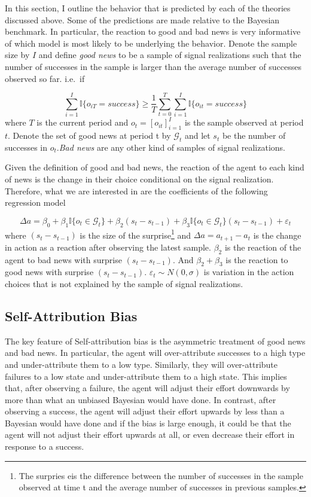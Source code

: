 \documentclass[
  12pt,
]{article}
\begin{document}
In this section, I outline the behavior that is predicted by each of the
theories discussed above. Some of the predictions are made relative to
the Bayesian benchmark. In particular, the reaction to good and bad news
is very informative of which model is most likely to be underlying the
behavior. Denote the sample size by \(I\) and define \emph{good news} to
be a sample of signal realizations such that the number of successes in
the sample is larger than the average number of successes observed so
far. i.e.~if

\[ \sum_{i=1}^I \mathbb{I}\{o_{iT}=success\} \geq \frac{1}{T} \sum_{t=0}^T\sum_{i=1}^I \mathbb{I}\{o_{it}=success\}\]
where \(T\) is the current period and \(o_{t}=[o_{it}]_{i=1}^I\) is the
sample observed at period \(t\). Denote the set of good news at period t
by \(\mathcal{G}_t\) and let \(s_t\) be the number of successes in
\(o_t\).\emph{Bad news} are any other kind of samples of signal
realizations.

Given the definition of good and bad news, the reaction of the agent to
each kind of news is the change in their choice conditional on the
signal realization. Therefore, what we are interested in are the
coefficients of the following regression model

\[ \Delta a = \beta_0 + \beta_1\mathbb{I}\{o_t\in \mathcal{G}_t\} + \beta_2(s_{t} - s_{t-1}) + \beta_3\mathbb{I}\{o_t\in \mathcal{G}_t\}(s_{t} - s_{t-1}) +\varepsilon_t \]
where \((s_{t} - s_{t-1})\) is the size of the
surprise\footnote{The surpries eis the difference between the number of successes in the sample observed at time t and the average number of successes in previous samples.}
and \(\Delta a = a_{t+1}-a_t\) is the change in action as a reaction
after observing the latest sample. \(\beta_2\) is the reaction of the
agent to bad news with surprise \((s_{t} - s_{t-1})\). And
\(\beta_2 + \beta_3\) is the reaction to good news with surprise
\((s_{t} - s_{t-1})\). \(\varepsilon_t\sim N(0, \sigma)\) is variation
in the action choices that is not explained by the sample of signal
realizations.

\hypertarget{self-attribution-bias}{%
\subsection{Self-Attribution Bias}\label{self-attribution-bias}}

The key feature of Self-attribution bias is the asymmetric treatment of
good news and bad news. In particular, the agent will over-attribute
successes to a high type and under-attribute them to a low type.
Similarly, they will over-attribute failures to a low state and
under-attribute them to a high state. This implies that, after observing
a failure, the agent will adjust their effort downwards by more than
what an unbiased Bayesian would have done. In contrast, after observing
a success, the agent will adjust their effort upwards by less than a
Bayesian would have done and if the bias is large enough, it could be
that the agent will not adjust their effort upwards at all, or even
decrease their effort in response to a success.
\end{document}
